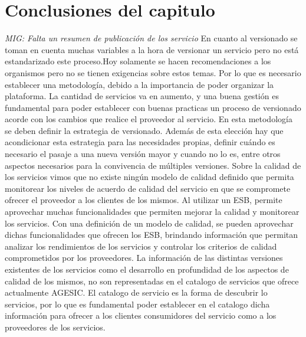 \section{Conclusiones del capitulo}
\label{Analisis:conclusiones}
\emph{MIG: Falta un resumen de publicación de los servicio}
En cuanto al versionado se toman en cuenta muchas variables a la hora de versionar un servicio pero no está estandarizado este proceso.Hoy solamente se hacen recomendaciones a los organismos pero no se tienen exigencias sobre estos temas. Por lo que es necesario establecer una metodología, debido a la importancia de poder organizar la plataforma. La cantidad de servicios va en aumento, y una buena gestión es fundamental para poder establecer con buenas practicas un proceso de versionado acorde con los cambios que realice el proveedor al servicio. En esta metodología se deben definir la estrategia de versionado. Además de esta elección hay que acondicionar esta estrategia para las necesidades propias, definir cuándo es necesario el pasaje a una nueva versión mayor y cuando no lo es, entre otros aspectos necesarios para la convivencia de múltiples versiones.
Sobre la calidad de los servicios vimos que no existe ningún modelo de calidad definido que permita monitorear los niveles de acuerdo de calidad del servicio en que se compromete ofrecer el proveedor a los clientes de los mismos. Al utilizar un ESB, permite aprovechar muchas funcionalidades que permiten mejorar la calidad y monitorear los servicios. Con una definición de un modelo de calidad, se pueden aprovechar dichas funcionalidades que ofrecen los ESB, brindando información que permitan analizar los rendimientos de los servicios y controlar los criterios de calidad comprometidos por los proveedores.
La información de las distintas versiones existentes de los servicios como el desarrollo en profundidad de los aspectos de calidad de los mismos, no son representadas en el catalogo de servicios que ofrece actualmente AGESIC. El catalogo de servicio es la forma de descubrir lo servicios, por lo que es fundamental poder establecer en el catalogo dicha información para ofrecer a los clientes consumidores del servicio como a los proveedores de los servicios.
